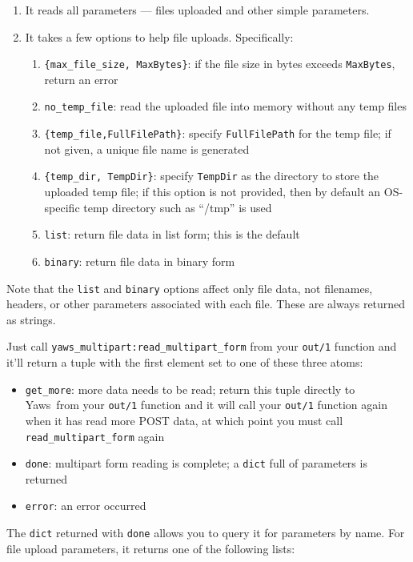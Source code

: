 \documentclass[11pt,oneside,english]{book}
\newcommand{\Yaws}            %
        {{\sc Yaws}}
\begin{document}
\begin{enumerate}
\item It reads all parameters --- files uploaded and other simple
  parameters.
\item It takes a few options to help file uploads. Specifically:
\begin{enumerate}
\item \verb+{max_file_size, MaxBytes}+: if the file size in bytes
  exceeds \verb+MaxBytes+, return an error
\item \verb+no_temp_file+: read the uploaded file into memory without
  any temp files
\item \verb+{temp_file,FullFilePath}+: specify \verb+FullFilePath+ for
  the temp file; if not given, a unique file name is generated
\item \verb+{temp_dir, TempDir}+: specify \verb+TempDir+ as the
  directory to store the uploaded temp file; if this option is not
  provided, then by default an OS-specific temp directory such as
  ``/tmp'' is used
\item \verb+list+: return file data in list form; this is the default
\item \verb+binary+: return file data in binary form
\end{enumerate}
\end{enumerate}

Note that the \verb+list+ and \verb+binary+ options affect only file
data, not filenames, headers, or other parameters associated with each
file. These are always returned as strings.

Just call \verb+yaws_multipart:read_multipart_form+ from your
\verb+out/1+ function and it'll return a tuple with the first element
set to one of these three atoms:

\begin{itemize}
\item \verb+get_more+: more data needs to be read; return this tuple
  directly to \Yaws\  from your \verb+out/1+ function and it will call
  your \verb+out/1+ function again when it has read more POST data, at
  which point you must call \verb+read_multipart_form+ again
\item \verb+done+: multipart form reading is complete; a
  \verb+dict+ full of parameters is returned
\item \verb+error+: an error occurred
\end{itemize}

The \verb+dict+ returned with \verb+done+ allows you to query it for
parameters by name. For file upload parameters, it returns one of the
following lists:
\end{document}
